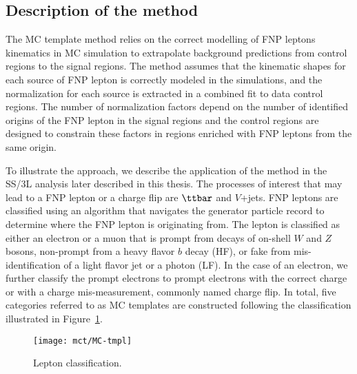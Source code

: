 



\subsection{Description of the method}

The MC template method relies on the correct modelling of FNP leptons kinematics in 
MC simulation to extrapolate background predictions from control regions to the signal regions.
The method assumes that the kinematic shapes for each source of FNP lepton is correctly modeled in the simulations, 
and the normalization for each source is extracted in a combined fit to data control regions.
The number of normalization factors depend on the number of identified origins of the FNP lepton in the signal regions
and the control regions are designed to constrain these factors in regions enriched with FNP leptons from the same origin.

To illustrate the approach, we describe the application of the method in 
the SS/3L analysis later described in this thesis.
The processes of interest that may lead to a FNP lepton or a charge flip are $\ttbar$ and $V$+jets. 
FNP leptons are classified using an algorithm that navigates the generator particle record to determine where the FNP lepton 
is originating from. 
The lepton is classified as either an electron or a muon that is prompt from decays of on-shell $W$ and $Z$ bosons, 
non-prompt from a heavy flavor $b$ decay (HF), or fake from mis-identification of a light flavor jet or a photon (LF). 
In the case of an electron, we further classify the prompt electrons to prompt electrons with the correct charge or with a 
charge mis-measurement, commonly named charge flip.
In total, five categories referred to as MC templates are constructed 
following the classification illustrated 
in Figure~\ref{Fig:fakes_classification}.

\begin{figure}[t!]
\centering
\texttt{[image: mct/MC-tmpl]}
\caption
{Lepton classification.
}
\label{Fig:fakes_classification}
\end{figure}

